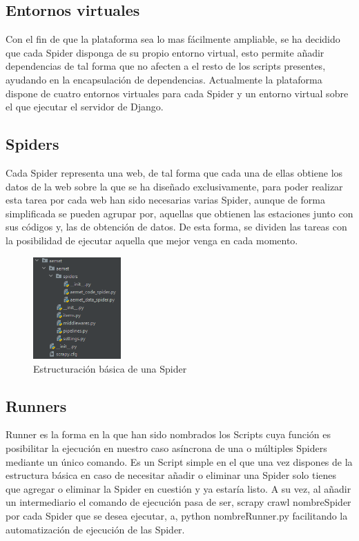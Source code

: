 \subsection{Entornos virtuales}
Con el fin de que la plataforma sea lo mas fácilmente ampliable, se ha decidido que cada Spider disponga de su propio entorno virtual, esto permite añadir dependencias de tal forma que no afecten a el resto de los scripts presentes, ayudando en la encapsulación de dependencias.\newline
\newline
Actualmente la plataforma dispone de cuatro entornos virtuales para cada Spider y un entorno virtual sobre el que ejecutar el servidor de Django.

\subsection{Spiders}
Cada Spider representa una web, de tal forma que cada una de ellas obtiene los datos de la web sobre la que se ha diseñado exclusivamente, para poder realizar esta tarea por cada web han sido necesarias varias Spider, aunque de forma simplificada se pueden agrupar por, aquellas que obtienen las estaciones junto con sus códigos y, las de obtención de datos.\newline
\newline
De esta forma, se dividen las tareas con la posibilidad de ejecutar aquella que mejor venga en cada momento.

\begin{figure} [H]
	\centering
	\includegraphics[width=0.3\textwidth]{fig/estructura_basica_spider.png}
	\caption[Estructuración básica de una Spider]{Estructuración básica de una Spider}
	\label{fig:ej8}
\end{figure}

\subsection{Runners}
Runner es la forma en la que han sido nombrados los Scripts cuya función es posibilitar la ejecución en nuestro caso asíncrona de una o múltiples Spiders mediante un único comando.\newline
\newline
Es un Script simple en el que una vez dispones de la estructura básica en caso de necesitar añadir o eliminar una Spider solo tienes que agregar o eliminar la Spider en cuestión y ya estaría listo.\newline
\newline
A su vez, al añadir un intermediario el comando de ejecución pasa de ser, scrapy crawl nombreSpider por cada Spider que se desea ejecutar, a, python nombreRunner.py facilitando la automatización de ejecución de las Spider.

